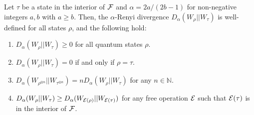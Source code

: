 \documentclass[pra,
aps,
twocolumn,
superscriptaddress,
groupedaddress,
nofootinbib,
reprint
]{revtex4-1}
\begin{document}
\begingroup
\def\thetheorem{\ref{thm:Da_props}}
\begin{theorem}
	Let $\tau$ be a state in the interior of ${\mathcal F}$ and $\alpha = 2a / (2b-1)$ for non-negative integers $a,b$ with $a \geq b$.
Then, the $\alpha$-Renyi divergence $D_\alpha(W_\rho || W_\tau)$ is well-defined for all states $\rho$, and the following hold:
\begin{enumerate}
\item $D_\alpha(W_\rho || W_\tau) \ge 0$ for all quantum states $\rho$.
\item  $D_\alpha(W_\rho || W_\tau) = 0$ if and only if $\rho =\tau$.
\item $D_\alpha(W_{\rho^{\otimes n}} || W_{\tau^{\otimes n}}) = n D_\alpha(W_\rho || W_\tau)$ for any $n \in \mathbb{N}$.
\item $D_\alpha(W_\rho || W_\tau) \geq D_\alpha (W_{{\mathcal E}(\rho)} || W_{{\mathcal E}(\tau)})$ for any free operation ${\mathcal E}$ such that ${\mathcal E}(\tau)$ is in the interior of ${\mathcal F}$.
\end{enumerate}
\end{theorem}
\addtocounter{theorem}{-1}
\endgroup
\end{document}
